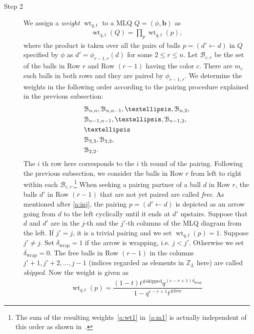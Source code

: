 \documentclass[11pt]{article}
\theoremstyle{definition}
\numberwithin{equation}{section}
\newcommand{\Z}{{\mathbb Z}}
\newcommand{\bb}{\mathbf{b}}
\DeclareMathOperator{\wt}{wt}
\newcommand{\defn}[1]{{\color{blue}\emph{#1}}}
\begin{document}
\begin{description}
\item[Step 2]
We assign a \defn{weight} ${\wt}_{q,t}$ to a MLQ $Q = (\phi, \bb)$ as
\begin{align}\label{a:wt1}
\wt_{q,t}(Q) = \prod_p \wt_{q,t}(p),
\end{align}
where the product is taken over all the pairs of balls $p = (d' \leftarrow d)$ in $Q$
specified by $\phi$ as $d' = \phi_{r-1,r}(d)$ for some $2 \le r \le n$.
%
Let $\mathcal{B}_{c,r}$ be the set of the balls in Row $r$ and Row $(r\!-\!1)$ having the color $c$.
There are $m_c$ such balls in both rows and they are paired by $\phi_{r-1,r}$.
We determine the weights in the following order according to the pairing procedure explained  in the previous subsection:
\begin{equation}\label{a:BB}
\begin{split}
&\mathcal{B}_{n,n}, \mathcal{B}_{n,n-1},\ldots, \mathcal{B}_{n,2}, \\ \smallskip
&\mathcal{B}_{n-1,n-1},\ldots, \mathcal{B}_{n-1,2}, \\ \smallskip
& \ldots \\ \smallskip
&\mathcal{B}_{3, 3}, \mathcal{B}_{3, 2}, \\ \smallskip
&\mathcal{B}_{2,2}.
\end{split}
\end{equation}
The $i$ th row here corresponds to the $i$ th round of the pairing.
%
Following the previous subsection,  
we consider the balls in Row $r$ from left to right within each $\mathcal{B}_{c,r}$.\footnote{
The sum of the resulting weights~\eqref{a:wt1} in~\eqref{a:m1} is actually independent of this order as shown in~\cite[Lem.~2.1]{CMW}.}
%
When seeking a pairing partner of 
a ball $d$ in Row $r$, the balls $d'$ in Row $(r-1)$ that are not yet paired are called \defn{free}.
As mentioned after \eqref{a:inj}, the pairing $p = (d' \leftarrow d)$ is depicted as an arrow
going from $d$ to the left cyclically until it ends at $d'$ upstairs.
Suppose that $d$ and $d'$ are in the $j$-th and the $j'$-th columns of the 
MLQ diagram from the left.
If $j'=j$, it is a trivial pairing and we set $\wt_{q,t}(p)=1$.
Suppose $j'\neq j$.
Set $\delta_{\text{wrap}}=1$ if the arrow is wrapping, i.e. $j<j'$.
Otherwise we set $\delta_{\text{wrap}}=0$.
The free balls in Row $(r-1)$ in the columns $j'+1, j'+2,\ldots, j-1$
(indices regarded as elements in $ \Z_L$ here) are called \defn{skipped}.
Now the weight is given as
\begin{align}
\wt_{q,t}(p) =
\dfrac{(1-t)t^{\#\text{skipped}}q^{(c-r+1)\delta_{\text{wrap}}}}{1-q^{c-r+1}t^{\#\text{free}}}

\end{align}
\end{description}
\end{document}
